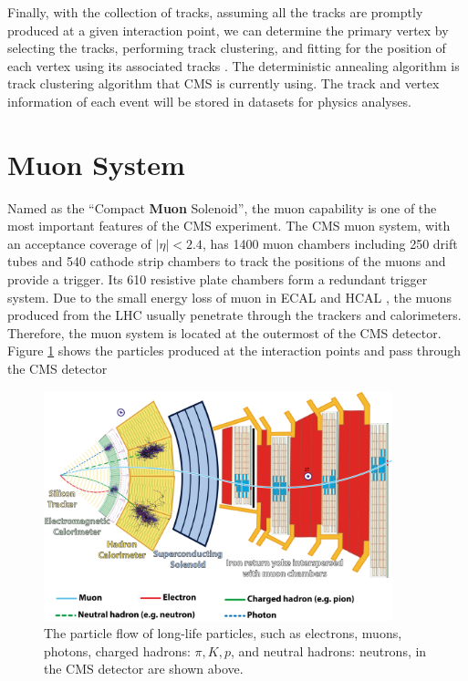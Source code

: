 Finally, with the collection of tracks, assuming all the tracks are promptly produced at a given interaction point, we can determine the primary vertex by selecting the tracks, performing track clustering, and fitting for the position of each vertex using its associated tracks \cite{CMSTrackComp}. The deterministic annealing algorithm \cite{DAAlgo} is track clustering algorithm that CMS is currently using. The track and vertex information of each event will be stored in datasets for physics analyses.

\fi

\section{Muon System}

Named as the ``Compact \textbf{Muon} Solenoid'', the muon capability is one of the most important features of the CMS experiment. The CMS muon system, with an acceptance coverage of $|\eta| < 2.4$, has 1400 muon chambers including 250 drift tubes and 540 cathode strip chambers to track the positions of the muons and provide a trigger. Its 610 resistive plate chambers form a redundant trigger system. Due to the small energy loss of muon in ECAL and HCAL \cite{AlphaTheoEx}, the muons produced from the LHC usually penetrate through the trackers and calorimeters. Therefore, the muon system is located at the outermost of the CMS detector. Figure \ref{ParticleFlow} shows the particles produced at the interaction points and pass through the CMS detector

\begin{figure}[hbtp]
\begin{center}
\includegraphics[width=0.90\textwidth]{Figures/Chapter3/CMSParticleFlow.png}
\caption{The particle flow of long-life particles, such as electrons, muons, photons, charged hadrons: $\pi,K,p$, and neutral hadrons: neutrons, in the CMS detector are shown above.}
\label{ParticleFlow}
\end{center}
\end{figure} 

